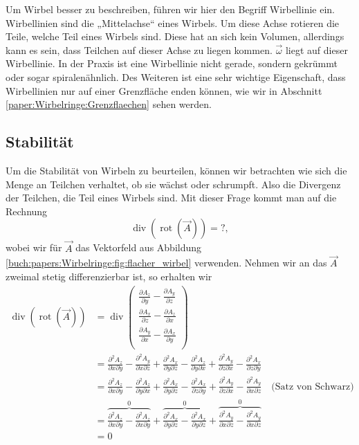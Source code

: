 Um Wirbel besser zu beschreiben, führen wir hier den Begriff Wirbellinie ein.
Wirbellinien sind die „Mittelachse“ eines Wirbels. 
Um diese Achse rotieren die Teile, welche Teil eines Wirbels sind. 
Diese hat an sich kein Volumen, allerdings kann es sein, dass Teilchen auf dieser Achse zu liegen kommen. 
\(\vec{\omega}\) liegt auf dieser Wirbellinie.  
In der Praxis ist eine Wirbellinie nicht gerade, sondern gekrümmt oder sogar spiralenähnlich. 
Des Weiteren ist eine sehr wichtige Eigenschaft, dass Wirbellinien nur auf einer Grenzfläche enden können, 
wie wir in Abschnitt \ref{paper:Wirbelringe:Grenzflaechen} sehen werden.

\subsection{Stabilität}

Um die Stabilität von Wirbeln zu beurteilen, können wir betrachten wie sich die Menge an Teilchen verhaltet, ob sie wächst oder schrumpft. 
Also die Divergenz der Teilchen, die Teil eines Wirbels sind.
Mit dieser Frage kommt man auf die Rechnung
\[
\operatorname{div} ( \operatorname{rot} ( \vec{A} ) )
= %
?,
\]
wobei wir für \(\vec{A}\) das Vektorfeld aus Abbildung \ref{buch:papers:Wirbelringe:fig:flacher_wirbel} verwenden.
Nehmen wir an das \(\vec{A}\) zweimal stetig differenzierbar ist, so erhalten wir
\begin{align*}
\operatorname{div} ( \operatorname{rot} ( \vec{A} ) )
&=
\operatorname{div}      
    \begin{pmatrix} 
        \frac{\partial A_z}{\partial y} - \frac{\partial A_y}{\partial z} \\ 
        \frac{\partial A_x}{\partial z} - \frac{\partial A_z}{\partial x} \\ 
        \frac{\partial A_y}{\partial x} - \frac{\partial A_x}{\partial y} \\ 
    \end{pmatrix} \\
&=
\frac{\partial^2 A_z}{\partial x \partial y} - \frac{\partial^2 A_y}{\partial x \partial z} + 
\frac{\partial^2 A_x}{\partial y \partial z} - \frac{\partial^2 A_z}{\partial y \partial x} +
\frac{\partial^2 A_y}{\partial z \partial x} - \frac{\partial^2 A_x}{\partial z \partial y}
\\
&=
\frac{\partial^2 A_z}{\partial x \partial y} - \frac{\partial^2 A_z}{\partial y \partial x} + 
\frac{\partial^2 A_x}{\partial y \partial z} - \frac{\partial^2 A_x}{\partial z \partial y} +
\frac{\partial^2 A_y}{\partial z \partial x} - \frac{\partial^2 A_y}{\partial x \partial z}
\quad \text{(Satz von Schwarz)}\\
&=
\overbrace{\frac{\partial^2 A_z}{\partial x \partial y} - \frac{\partial^2 A_z}{\partial x \partial y}}^0 + 
\overbrace{\frac{\partial^2 A_x}{\partial y \partial z} - \frac{\partial^2 A_x}{\partial y \partial z}}^0 +
\overbrace{\frac{\partial^2 A_y}{\partial x \partial z} - \frac{\partial^2 A_y}{\partial x \partial z}}^0
\\
&=
0
\end{align*}

